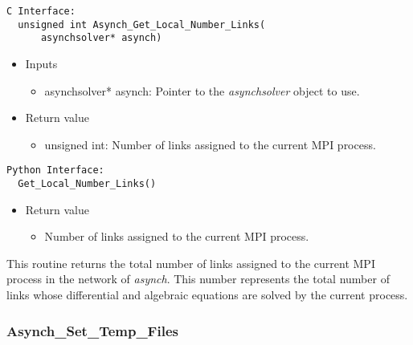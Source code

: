 \documentclass[12pt]{article}
\begin{document}
\begin{lstlisting}[style=CStyle]
  C Interface:
  unsigned int Asynch_Get_Local_Number_Links(
      asynchsolver* asynch)
\end{lstlisting}
\begin{itemize}
 \item Inputs
  \begin{itemize}
   \item asynchsolver* asynch: Pointer to the \emph{asynchsolver} object to use.
  \end{itemize}
 \item Return value
  \begin{itemize}
   \item unsigned int: Number of links assigned to the current MPI process.
  \end{itemize}
\end{itemize}
\begin{lstlisting}[style=PythonStyle]
  Python Interface:
  Get_Local_Number_Links()
\end{lstlisting}
\begin{itemize}
 \item Return value
  \begin{itemize}
   \item Number of links assigned to the current MPI process.
  \end{itemize}
\end{itemize}
This routine returns the total number of links assigned to the current MPI process in the network of \emph{asynch}. This number represents the total number of links whose differential and algebraic equations are solved by the current process.


\subsubsection{Asynch\_Set\_Temp\_Files} \label{sec: asynch_set_temp_files}
\end{document}
